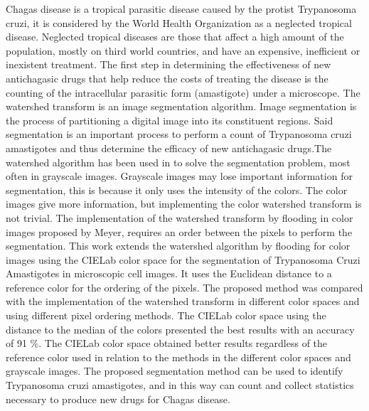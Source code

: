 \begin{resuingles}
Chagas disease is a tropical parasitic disease caused by the protist Trypanosoma cruzi, it is considered by the World Health Organization as a neglected tropical disease. Neglected tropical diseases are those that affect a high amount of the population, mostly on third world countries, and have an expensive, inefficient or inexistent treatment. The first step in determining the effectiveness of new antichagasic drugs that help reduce the costs of treating the disease is the counting of the intracellular parasitic form (amastigote) under a microscope.
The watershed transform is an image segmentation algorithm.
Image segmentation is the process of partitioning a digital image into its constituent regions. Said segmentation is an important process to perform a count of Trypanosoma cruzi amastigotes and thus determine the efficacy of new antichagasic drugs.The watershed algorithm has been used in to solve the segmentation problem, most often in grayscale images. Grayscale images may lose important information for segmentation, this is because it only uses the intensity of the colors. The color images give more information, but implementing the color watershed transform is not trivial. The implementation of the watershed transform by flooding in color images proposed by Meyer, requires an order between the pixels to perform the segmentation. This work extends the watershed algorithm by flooding for color images using the CIELab color space for the segmentation of Trypanosoma Cruzi Amastigotes in microscopic cell images. It uses the Euclidean distance to a reference color for the ordering of the pixels. The proposed method was compared with the implementation of the watershed transform in different color spaces and using different pixel ordering methods. The CIELab color space using the distance to the median of the colors presented the best results with an accuracy of 91 \%. The CIELab color space obtained better results regardless of the reference color used in relation to the methods in the different color spaces and grayscale images. The proposed segmentation method can be used to identify Trypanosoma cruzi amastigotes, and in this way can count and collect statistics necessary to produce new drugs for Chagas disease.

\end{resuingles}


